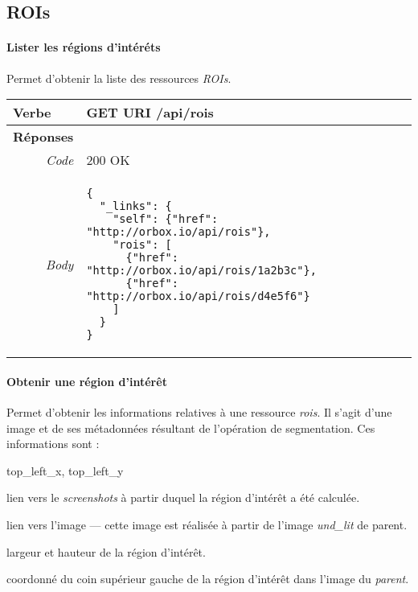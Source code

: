 \begin{appendices}

\begin{absolutelynopagebreak}
\section{ROIs}

\paragraph{Lister les régions d'intéréts}

Permet d'obtenir la liste des ressources \emph{ROIs}.

\begin{tabular}{@{}p{2cm}p{11.5cm}@{}}
    \toprule
    \textbf{Verbe}                        & GET \hspace{2.5cm} \textbf{URI} \hspace{0.25cm} /api/rois   \\ \midrule
    \textbf{Réponses}                     &        \\
    \multicolumn{1}{r}{\textit{Code}}   & 200 OK \\
    \multicolumn{1}{r}{\textit{Body}}   & \begin{verbatim}
{
  "_links": {
    "self": {"href": "http://orbox.io/api/rois"},
    "rois": [
      {"href": "http://orbox.io/api/rois/1a2b3c"},
      {"href": "http://orbox.io/api/rois/d4e5f6"}
    ]
  }
}
    \end{verbatim}
    \\ \bottomrule
\end{tabular}
\end{absolutelynopagebreak}
  
\begin{absolutelynopagebreak}
\paragraph{Obtenir une région d'intérêt}

Permet d'obtenir les informations relatives à une ressource \emph{rois}.
Il s'agit d'une image et de ses métadonnées résultant de l'opération de segmentation.
Ces informations sont :
\begin{labeling}[~--]{top\_left\_x, top\_left\_y}
    \item [parent] lien vers le \emph{screenshots} à partir duquel la région d'intérêt a été calculée.
    \item [img] lien vers l'image --- cette image est réalisée à partir de l'image \emph{und\_lit} de parent.
    \item [width, height] largeur et hauteur de la région d'intérêt.
    \item [top\_left\_x, top\_left\_y] coordonné du coin supérieur gauche de la région d'intérêt dans l'image du \emph{parent}.
\end{labeling}


\end{absolutelynopagebreak}
\end{appendices}
